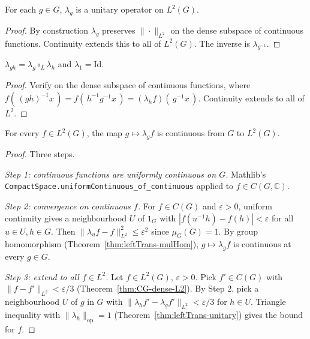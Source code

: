 \begin{theorem}
  \label{thm:leftTrans-unitary}
  For each $g \in G$, $\lambda_g$ is a unitary operator on $L^2(G)$.
\end{theorem}

\begin{proof}
  By construction $\lambda_g$ preserves $\|\cdot\|_{L^2}$ on the dense
  subspace of continuous functions. Continuity extends this to all of
  $L^2(G)$. The inverse is $\lambda_{g^{-1}}$.
\end{proof}

\begin{theorem}
  \label{thm:leftTrans-mulHom}
  $\lambda_{gh} = \lambda_g \circ_L \lambda_h$ and $\lambda_1 = \mathrm{Id}$.
\end{theorem}

\begin{proof}
  Verify on the dense subspace of continuous functions, where
  $f(\,(gh)^{-1} x\,) = f(\,h^{-1} g^{-1} x\,) = (\lambda_h f)(\,g^{-1}x\,)$.
  Continuity extends to all of $L^2$.
\end{proof}

\begin{theorem}
  \label{thm:leftTrans-strongCts}
  For every $f \in L^2(G)$, the map
  $g \mapsto \lambda_g f$ is continuous from $G$ to $L^2(G)$.
\end{theorem}

\begin{proof}
  Three steps.

  \emph{Step 1: continuous functions are uniformly continuous on $G$.}
  Mathlib's \texttt{CompactSpace.uniformContinuous\_of\_continuous}
  applied to $f \in C(G, \mathbb C)$.

  \emph{Step 2: convergence on continuous $f$.}
  For $f \in C(G)$ and $\varepsilon > 0$, uniform continuity gives a
  neighbourhood $U$ of $1_G$ with $|f(u^{-1}h) - f(h)| < \varepsilon$
  for all $u \in U, h \in G$. Then
  $\|\lambda_u f - f\|_{L^2}^2 \leq \varepsilon^2$ since $\mu_G(G) = 1$.
  By group homomorphism (Theorem~\ref{thm:leftTrans-mulHom}),
  $g \mapsto \lambda_g f$ is continuous at every $g \in G$.

  \emph{Step 3: extend to all $f \in L^2$.}
  Let $f \in L^2(G)$, $\varepsilon > 0$. Pick $f' \in C(G)$ with
  $\|f - f'\|_{L^2} < \varepsilon/3$ (Theorem~\ref{thm:CG-dense-L2}).
  By Step 2, pick a neighbourhood $U$ of $g$ in $G$ with
  $\|\lambda_h f' - \lambda_g f'\|_{L^2} < \varepsilon/3$ for $h \in U$.
  Triangle inequality with $\|\lambda_h\|_{\mathrm{op}} = 1$
  (Theorem~\ref{thm:leftTrans-unitary}) gives the bound for $f$.
\end{proof}

